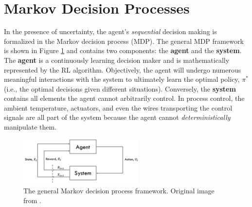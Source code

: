 %
%

\section{Markov Decision Processes}
In the presence of uncertainty, the agent's \textit{sequential} decision making is formalized in the Markov decision process (MDP). The general MDP framework is shown in Figure \ref{fig:01mdp} and contains two components: the \textbf{agent} and the \textbf{system}. The \textbf{agent} is a continuously learning decision maker and is mathematically represented by the RL algorithm. Objectively, the agent will undergo numerous meaningful interactions with the system to ultimately learn the optimal policy, $\pi^*$ (i.e., the optimal decisions given different situations). Conversely, the \textbf{system} contains all elements the agent cannot arbitrarily control. In process control, the ambient temperature, actuators, and even the wires transporting the control signals are all part of the system because the agent cannot \textit{deterministically} manipulate them. 

\begin{figure}[H]
    \centering
    \includegraphics[width=0.56\textwidth]{images/ch1/MDP.jpeg}
    \caption{The general Markov decision process framework. Original image from \cite{sutton}.}
    \label{fig:01mdp}
\end{figure}   

